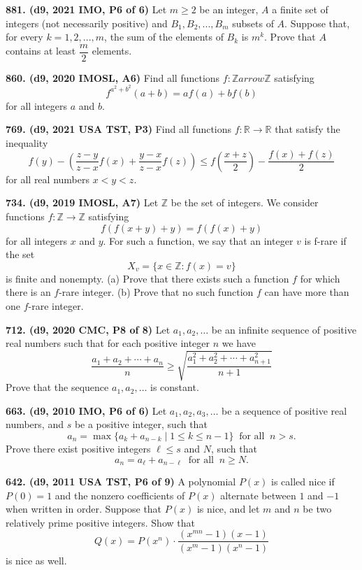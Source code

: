 \documentclass{article}
\begin{document}
\textbf{881. (\color{red}d9\color{black}, 2021 IMO, P6 of 6)} Let $m\ge 2$ be an integer, $A$ a finite set of integers (not necessarily positive) and $B_1,B_2,...,B_m$ subsets of $A$. Suppose that, for every $k=1,2,...,m$, the sum of the elements of $B_k$ is $m^k$. Prove that $A$ contains at least $\dfrac{m}{2}$ elements.

\textbf{860. (\color{red}d9\color{black}, 2020 IMOSL, A6)} Find all functions $f : \mathbb{Z}arrow \mathbb{Z}$ satisfying \[f^{a^{2} + b^{2}}(a+b) = af(a) +bf(b)\] for all integers $a$ and $b.$

\textbf{769. (\color{red}d9\color{black}, 2021 USA TST, P3)} Find all functions $f \colon \mathbb{R} \to \mathbb{R}$ that satisfy the inequality
\[ f(y) - (\frac{z-y}{z-x} f(x) + \frac{y-x}{z-x}f(z)) \leq f(\frac{x+z}{2}) - \frac{f(x)+f(z)}{2} \]
for all real numbers $x < y < z$.

\textbf{734. (\color{red}d9\color{black}, 2019 IMOSL, A7)} Let $\mathbb Z$ be the set of integers. We consider functions $f :\mathbb Z\to\mathbb Z$ satisfying
\[f(f(x+y)+y)=f(f(x)+y)\]for all integers $x$ and $y$. For such a function, we say that an integer $v$ is f-rare if the set
\[X_v=\{x\in\mathbb Z:f(x)=v\}\]is finite and nonempty.
(a) Prove that there exists such a function $f$ for which there is an $f$-rare integer.
(b) Prove that no such function $f$ can have more than one $f$-rare integer.

\textbf{712. (\color{red}d9\color{black}, 2020 CMC, P8 of 8)} Let $a_{1}, a_{2}, \ldots$ be an infinite sequence of positive real numbers such that for each positive integer $n$ we have $$\frac{a_{1}+a_{2}+\cdots+a_{n}}{n} \geq \sqrt{\frac{a_{1}^{2}+a_{2}^{2}+\cdots+a_{n+1}^{2}}{n+1}}$$ Prove that the sequence $a_{1}, a_{2}, \ldots$ is constant.

\textbf{663. (\color{red}d9\color{black}, 2010 IMO, P6 of 6)} Let $a_1, a_2, a_3, \ldots$ be a sequence of positive real numbers, and $s$ be a positive integer, such that
\[a_n = \max \{ a_k + a_{n-k} \mid 1 \leq k \leq n-1 \} \ \textrm{ for all } \ n > s.\]
Prove there exist positive integers $\ell \leq s$ and $N$, such that
\[a_n = a_{\ell} + a_{n - \ell} \ \textrm{ for all } \ n \geq N.\]


\textbf{642. (\color{red}d9\color{black}, 2011 USA TST, P6 of 9)} A polynomial $P(x)$ is called nice if $P(0) = 1$ and the nonzero coefficients of $P(x)$ alternate between $1$ and $-1$ when written in order. Suppose that $P(x)$ is nice, and let $m$ and $n$ be two relatively prime positive integers. Show that \[Q(x) = P(x^n) \cdot \frac{(x^{mn} - 1)(x-1)}{(x^m-1)(x^n-1)}\] is nice as well.
\end{document}
